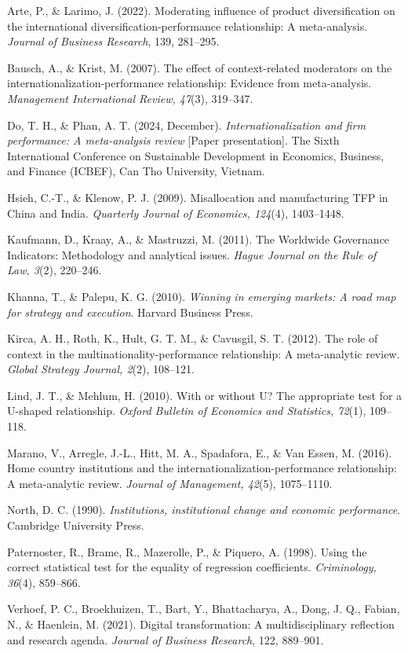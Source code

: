 \documentclass[12pt,a4paper]{article}
\begin{document}
Arte, P., \& Larimo, J. (2022). Moderating influence of product
diversification on the international diversification-performance
relationship: A meta-analysis. \emph{Journal of Business Research}, 139,
281--295.

Bausch, A., \& Krist, M. (2007). The effect of context-related
moderators on the internationalization-performance relationship:
Evidence from meta-analysis. \emph{Management International Review,
47}(3), 319--347.

Do, T. H., \& Phan, A. T. (2024, December). \emph{Internationalization
and firm performance: A meta-analysis review} {[}Paper presentation{]}.
The Sixth International Conference on Sustainable Development in
Economics, Business, and Finance (ICBEF), Can Tho University, Vietnam.

Hsieh, C.-T., \& Klenow, P. J. (2009). Misallocation and manufacturing
TFP in China and India. \emph{Quarterly Journal of Economics, 124}(4),
1403--1448.

Kaufmann, D., Kraay, A., \& Mastruzzi, M. (2011). The Worldwide
Governance Indicators: Methodology and analytical issues. \emph{Hague
Journal on the Rule of Law, 3}(2), 220--246.

Khanna, T., \& Palepu, K. G. (2010). \emph{Winning in emerging markets:
A road map for strategy and execution}. Harvard Business Press.

Kirca, A. H., Roth, K., Hult, G. T. M., \& Cavusgil, S. T. (2012). The
role of context in the multinationality-performance relationship: A
meta-analytic review. \emph{Global Strategy Journal, 2}(2), 108--121.

Lind, J. T., \& Mehlum, H. (2010). With or without U? The appropriate
test for a U-shaped relationship. \emph{Oxford Bulletin of Economics and
Statistics, 72}(1), 109--118.

Marano, V., Arregle, J.-L., Hitt, M. A., Spadafora, E., \& Van Essen, M.
(2016). Home country institutions and the
internationalization-performance relationship: A meta-analytic review.
\emph{Journal of Management, 42}(5), 1075--1110.

North, D. C. (1990). \emph{Institutions, institutional change and
economic performance}. Cambridge University Press.

Paternoster, R., Brame, R., Mazerolle, P., \& Piquero, A. (1998). Using
the correct statistical test for the equality of regression
coefficients. \emph{Criminology, 36}(4), 859--866.

Verhoef, P. C., Broekhuizen, T., Bart, Y., Bhattacharya, A., Dong, J.
Q., Fabian, N., \& Haenlein, M. (2021). Digital transformation: A
multidisciplinary reflection and research agenda. \emph{Journal of
Business Research}, 122, 889--901.
\end{document}
